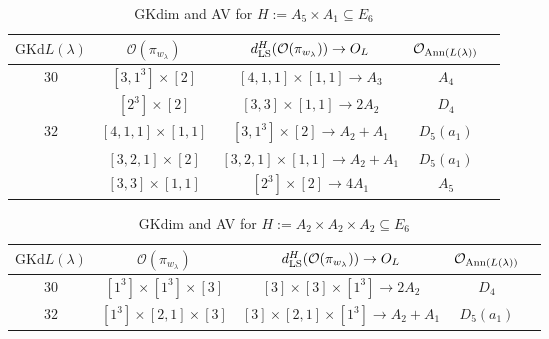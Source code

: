 \documentclass[reqno,12pt]{amsart}
\numberwithin{equation}{section}
\theoremstyle{plain}
\theoremstyle{definition}
\newcommand{\lam}{\lambda}
\renewcommand{\subset}{\subseteq}
\begin{document}
\begin{table}[htbp]\caption{ GKdim and AV for $H:=A_5\times A_1 \subset E_6$}
	\label{taba5a1}
	\centering
	\renewcommand{\arraystretch}{1.5}
	\setlength\tabcolsep{5pt}
	
	\begin{tabular}{|c|c|c|c|c|}
		\hline $\mathrm{GKd} L(\lambda)$ &     $\mathcal{O}({\pi_{w_{\lam}}})$& $d_{\rm LS}^{H}(\mathcal{O}(\pi_{w_\lambda}))\rightarrow O_{L}$ & $\mathcal{O}_{{\rm Ann}(L(\lambda))}$ \\ \hline
     $30$  &  $ [3,1^3]\times [2] $  & $[4,1,1]\times [1,1]\rightarrow A_3 $     &   $ A_4$      \\
    &  $ [2^3]\times [2]$  & $[3,3]\times [1,1]\rightarrow 2A_2 $     &   $ D_4$      \\
      \hline
        
         $ 32 $    &  $ [4,1,1]\times [1,1] $  & $[3,1^3]\times [2]\rightarrow A_2+A_1$     &   $ D_5(a_1)$      \\
         &  $ [3,2,1]\times [2] $  & $[3,2,1]\times [1,1]\rightarrow A_2+A_1$     &   $ D_5(a_1)$\\
         &  $ [3,3]\times [1,1] $  & $[2^3]\times [2]\rightarrow4A_1$     &   $ A_5$\\
         \hline
        
\end{tabular}
	\bigskip
	
\end{table}


\begin{table}[htbp]\caption{ GKdim and AV for $H:=A_2\times A_2\times A_2 \subset E_6$}
	\label{taba2a2a2}
	\centering
	\renewcommand{\arraystretch}{1.5}
	\setlength\tabcolsep{5pt}
	
	\begin{tabular}{|c|c|c|c|c|}
		\hline $\mathrm{GKd} L(\lambda)$ &   $\mathcal{O}({\pi_{w_{\lam}}})$& $d_{\rm LS}^{H}(\mathcal{O}(\pi_{w_\lambda}))\rightarrow O_{L}$ & $\mathcal{O}_{{\rm Ann}(L(\lambda))}$ \\ \hline
     $30$  &  $ [1^3]\times[1^3]\times [3] $  & $[3]\times [3]\times [1^3]\rightarrow 2A_2 $     &   $ D_4$      \\
      \hline
        
         $ 32 $   &  $ [1^3]\times[2,1]\times [3] $  & $[3]\times [2,1]\times [1^3]\rightarrow A_2+A_1 $     &   $ D_5(a_1)$      \\
      \hline
        
\end{tabular}
	\bigskip
	
\end{table}
\end{document}

